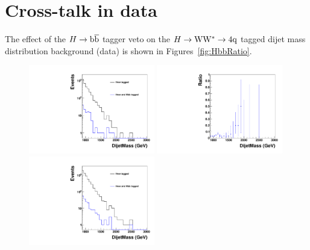 \newpage
\section{Cross-talk in data}
\label{appendix:crosstalkData}

The effect of the $H\to\mathrm{b\overline{b}}$ tagger veto on the $H\to{\rm W}{\rm W}^*\to4{\rm q}$ tagged dijet
mass distribution
background (data) is shown in Figures~\ref{fig:HbbRatio}.


\begin{figure}[ht]
\begin{center}
\includegraphics[width=0.49\textwidth, height=0.45\textwidth]{EXO-14-009/HqqqqZqqfigs/HbbHww/HighPurity.pdf}
\includegraphics[width=0.49\textwidth, height=0.45\textwidth]{EXO-14-009/HqqqqZqqfigs/HbbHww/HighPurityRatio.pdf}
\includegraphics[width=0.49\textwidth, height=0.45\textwidth]{EXO-14-009/HqqqqZqqfigs/HbbHww/LowHPurity.pdf}

\end{center}
\end{figure}

